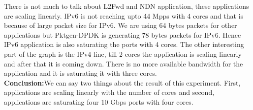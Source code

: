 There is not much to talk about L2Fwd and NDN application, these applications are scaling linearly. IPv6 is not reaching upto 44 Mpps with 4 cores and that is because of large packet size for IPv6. We are using 64 bytes packets for other applications but Pktgen-DPDK is generating 78 bytes packets for IPv6. Hence IPv6 application is also saturating the ports with 4 cores. The other interesting part of the graph is the IPv4 line, till 2 cores the application is scaling linearly and after that it is coming down. There is no more available bandwidth for the application and it is saturating it with three cores. 
\\
\textbf{Conclusion:}We can say two things about the result of this experiment. First, applications are scaling linearly with the number of cores and second, applications are saturating four 10 Gbps ports with four cores.

